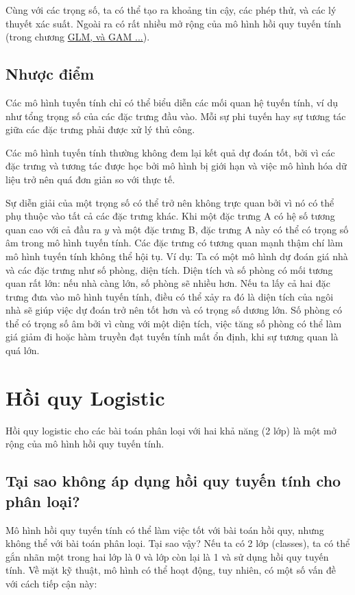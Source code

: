 Cùng với các trọng số, ta có thể tạo ra khoảng tin cậy, các phép thử, và các lý thuyết xác suất. Ngoài ra có rất nhiều mở rộng của mô hình hồi quy tuyến tính (trong chương \href{TODO}{GLM, và GAM ...}).

\subsection{Nhược điểm}
Các mô hình tuyến tính chỉ có thể biểu diễn các mối quan hệ tuyến tính, ví dụ như tổng trọng số của các đặc trưng đầu vào. Mỗi sự phi tuyến hay sự tương tác giữa các đặc trưng phải được xử lý thủ công.

Các mô hình tuyến tính thường không đem lại kết quả dự đoán tốt, bởi vì các đặc trưng và tương tác được học bởi mô hình bị giới hạn và việc mô hình hóa dữ liệu trở nên quá đơn giản so với thực tế.

Sự diễn giải của một trọng số có thể trở nên không trực quan bởi vì nó có thể phụ thuộc vào tất cả các đặc trưng khác. Khi một đặc trưng A có hệ số tương quan cao với cả đầu ra $y$ và một đặc trưng B, đặc trưng A này có thể có trọng số âm trong mô hình tuyến tính. Các đặc trưng có tương quan mạnh thậm chí làm mô hình tuyến tính không thể hội tụ. Ví dụ: Ta có một mô hình dự đoán giá nhà và các đặc trưng như số phòng, diện tích. Diện tích và số phòng có mối tương quan rất lớn: nếu nhà càng lớn, số phòng sẽ nhiều hơn. Nếu ta lấy cả hai đặc trưng đưa vào mô hình tuyến tính, điều có thể xảy ra đó là diện tích của ngôi nhà sẽ giúp việc dự đoán trở nên tốt hơn và có trọng số dương lớn. Số phòng có thể có trọng số âm bởi vì cùng với một diện tích, việc tăng số phòng có thể làm giá giảm đi hoặc hàm truyền đạt tuyến tính mất ổn định, khi sự tương quan là quá lớn.

\section{Hồi quy Logistic}
Hồi quy logistic cho các bài toán phân loại với hai khả năng (2 lớp) là một mở rộng của mô hình hồi quy tuyến tính.

\subsection{Tại sao không áp dụng hồi quy tuyến tính cho phân loại?}

Mô hình hồi quy tuyến tính có thể làm việc tốt với bài toán hồi quy, nhưng không thể với bài toán phân loại. Tại sao vậy? Nếu ta có 2 lớp (classes), ta có thể gắn nhãn một trong hai lớp là 0 và lớp còn lại là 1 và sử dụng hồi quy tuyến tính. Về mặt kỹ thuật, mô hình có thể hoạt động, tuy nhiên, có một số vấn đề với cách tiếp cận này:


